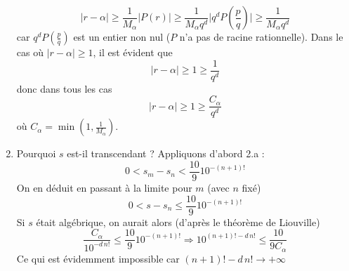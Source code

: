 \begin{enumerate}
\[\vert r -\alpha \vert \geq \frac{1}{M_\alpha}\vert P(r)\vert \geq 
\frac{1}{M_\alpha q^d}\vert q^dP(\frac{p}{q})\vert \geq \frac{1}{M_\alpha q^d}\]
car $q^dP(\frac{p}{q})$ est un entier non nul ($P$ n'a pas de racine rationnelle).\newline
Dans le cas où $\vert r -\alpha \vert \geq 1$, il est évident que
\[\vert r -\alpha \vert \geq 1\geq \frac{1}{q^d}\]
donc dans tous les cas
\[\vert r -\alpha \vert \geq 1\geq \frac{C_\alpha}{q^d}\]
où $C_\alpha = \min (1,\frac{1}{M_\alpha})$.
\item Pourquoi $s$ est-il transcendant ?\newline
Appliquons d'abord 2.a :
\[0<s_m -s_n < \frac{10}{9}10^{-(n+1)!}\]
On en déduit en passant à la limite pour $m$ (avec $n$ fixé)
\begin{displaymath}
 0<s -s_n \leq \frac{10}{9}10^{-(n+1)!}
\end{displaymath}
Si $s$ était algébrique, on aurait alors (d'après le théorème de Liouville)
\begin{displaymath}
 \frac{C_\alpha}{10^{-d\, n!}}\leq \frac{10}{9}10^{-(n+1)!}
\Rightarrow
10^{(n+1)!-d\,n!}\leq \frac{10}{9 C_\alpha}
\end{displaymath}
Ce qui est évidemment impossible car $(n+1)!-d\,n! \rightarrow +\infty$ 
\end{enumerate}

